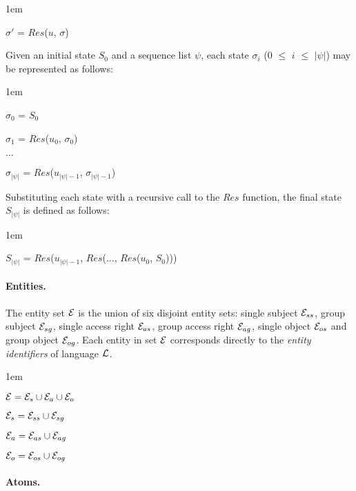 \documentclass[global,twocolumn,draft]{svjour}
\newenvironment{vquote}
  {\begin{list}{}{\leftmargin 1em}\item[]}
  {\end{list}}
\begin{document}
        \begin{vquote}
          $\sigma'$ = $Res$($u$, $\sigma$)
        \end{vquote}

        Given an initial state $S_{0}$ and a sequence list $\psi$, each state
        $\sigma_{i}$ ($0$ $\leq$ $i$ $\leq$ $|\psi|$) may be represented as
        follows:

        \begin{vquote}
          $\sigma_{0}$ = $S_{0}$

          $\sigma_{1}$ = $Res$($u_{0}$, $\sigma_{0}$)

          $\ldots$

          $\sigma_{|\psi|}$ = $Res$($u_{|\psi| - 1}$, $\sigma_{|\psi| - 1}$)
        \end{vquote}

        Substituting each state with a recursive call to the $Res$ function,
        the final state $S_{|\psi|}$ is defined as follows:

        \begin{vquote}
          $S_{|\psi|}$ = $Res$($u_{|\psi| - 1}$, $Res$($\ldots$, $Res$($u_{0}$, $S_{0}$)))
        \end{vquote}

        \paragraph{Entities.}

          The entity set ${\cal E}$ is the union of six disjoint entity sets:
          single subject ${\cal E}_{ss}$, group subject ${\cal E}_{sg}$,
          single access right ${\cal E}_{as}$, group access right
          ${\cal E}_{ag}$, single object ${\cal E}_{os}$ and group object
          ${\cal E}_{og}$. Each entity in set ${\cal E}$ corresponds directly
          to the {\em entity identifiers} of language ${\cal L}$.

          \begin{vquote}
            ${\cal E} = {\cal E}_{s} \cup {\cal E}_{a} \cup {\cal E}_{o}$

            ${\cal E}_{s} = {\cal E}_{ss} \cup {\cal E}_{sg}$

            ${\cal E}_{a} = {\cal E}_{as} \cup {\cal E}_{ag}$

            ${\cal E}_{o} = {\cal E}_{os} \cup {\cal E}_{og}$
          \end{vquote}

        \paragraph{Atoms.}
\end{document}
